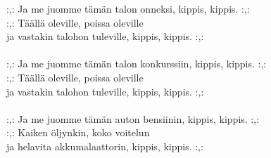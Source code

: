 
            :,: Ja me juomme tämän talon onneksi, kippis, kippis. :,: \\
            :,: Täällä oleville, poissa oleville \\
            ja vastakin talohon tuleville, kippis, kippis. :,: \\
\hspace{10mm} \\
            :,: Ja me juomme tämän talon konkurssiin, kippis, kippis. :,: \\
            :,: Täällä oleville, poissa oleville \\
            ja vastakin talohon tuleville, kippis, kippis. :,: \\
\hspace{10mm} \\
            :,: Ja me juomme tämän auton bensiinin, kippis, kippis. :,: \\
            :,: Kaiken öljynkin, koko voitelun \\
            ja helavita akkumalaattorin, kippis, kippis. :,: \\
